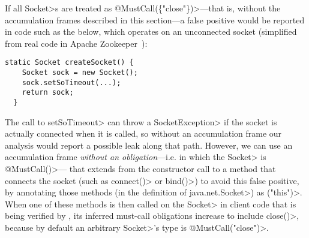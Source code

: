 If all \<Socket>s are treated as \<@MustCall(\{"close"\})>---that is,
without the accumulation frames described in this section---a false positive
would be reported
in code such as the below, which operates on an unconnected socket
(simplified from real code in Apache Zookeeper~):

\begin{lstlisting}[frame=tb,belowskip=3mm]
  static Socket createSocket() {
    Socket sock = new Socket();
    sock.setSoTimeout(...);
    return sock;
  }
\end{lstlisting}

The call to \<setSoTimeout> can throw a \<SocketException> if the
socket is actually connected when it is called, so without an
accumulation frame our analysis would report a possible leak along
that path.  However, we can use an accumulation frame \emph{without an
  obligation}---i.e. in which the \<Socket> is \<@MustCall({})>---
that extends from the constructor call to a method that connects the
socket (such as \<connect()> or \<bind()>) to avoid this false
positive, by annotating those methods (in the definition of
\<java.net.Socket>) as \ResetMustCall\<("this")>.  When one of these
methods is then called on the \<Socket> in client code that is being
verified by \Tool, its inferred must-call obligations increase to include
\<close()>, because by default an arbitrary \<Socket>'s type is
\<@MustCall("close")>.

